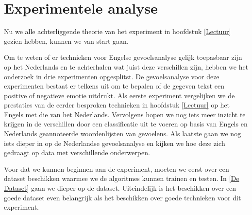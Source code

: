 \chapter{Experimentele analyse}\label{Experiment}

Nu we alle achterliggende theorie van het experiment in hoofdstuk \ref{Lectuur} gezien hebben, kunnen we van start gaan. 

Om te weten of er technieken voor Engelse gevoelsanalyse gelijk toepasbaar zijn op het Nederlands en te achterhalen wat juist deze verschillen zijn, hebben we het onderzoek in drie experimenten opgesplitst. De gevoelsanalyse voor deze experimenten bestaat er telkens uit om te bepalen of de gegeven tekst een positive of negatieve emotie uitdrukt. Als eerste experiment vergelijken we de prestaties van de eerder besproken technieken in hoofdstuk \ref{Lectuur} op het Engels met die van het Nederlands. Vervolgens hopen we nog iets meer inzicht te krijgen in de verschillen door een classificatie uit te voeren op basis van Engels en Nederlands geannoteerde woordenlijsten van gevoelens. Als laatste gaan we nog iets dieper in op de Nederlandse gevoelsanalyse en kijken we hoe deze zich gedraagt op data met verschillende onderwerpen.

Voor dat we kunnen beginnen aan de experiment, moeten we eerst over een dataset beschikken waarmee we de algoritmes kunnen trainen en testen. In \ref{De Dataset} gaan we dieper op de dataset. Uiteindelijk is het beschikken over een goede dataset even belangrijk als het beschikken over goede technieken voor dit experiment. 


